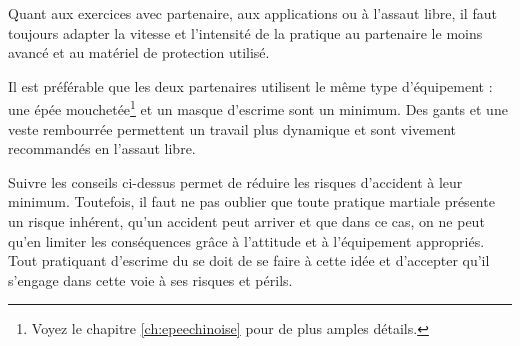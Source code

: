 Quant aux exercices avec partenaire, aux applications ou à l'assaut libre, il faut toujours adapter la vitesse et l'intensité de la pratique au partenaire le moins avancé et au matériel de protection utilisé. 
 
Il est préférable que les deux partenaires utilisent le même type d'équipement : une épée mouchetée\footnote{Voyez le chapitre \ref*{ch:epeechinoise} pour de plus amples détails.} et un masque d'escrime sont un minimum. Des gants et une veste rembourrée permettent un travail plus dynamique et sont vivement recommandés en l'assaut libre.  

Suivre les conseils ci-dessus permet de réduire les risques d'accident à leur minimum. Toutefois, il faut ne pas oublier que toute pratique martiale présente un risque inhérent, qu'un accident peut arriver et que dans ce cas, on ne peut qu'en limiter les conséquences grâce à l'attitude et à l'équipement appropriés. Tout pratiquant d'escrime du \Taijijian{} se doit de se faire à cette idée et d'accepter qu'il s'engage dans cette voie à ses risques et périls.
